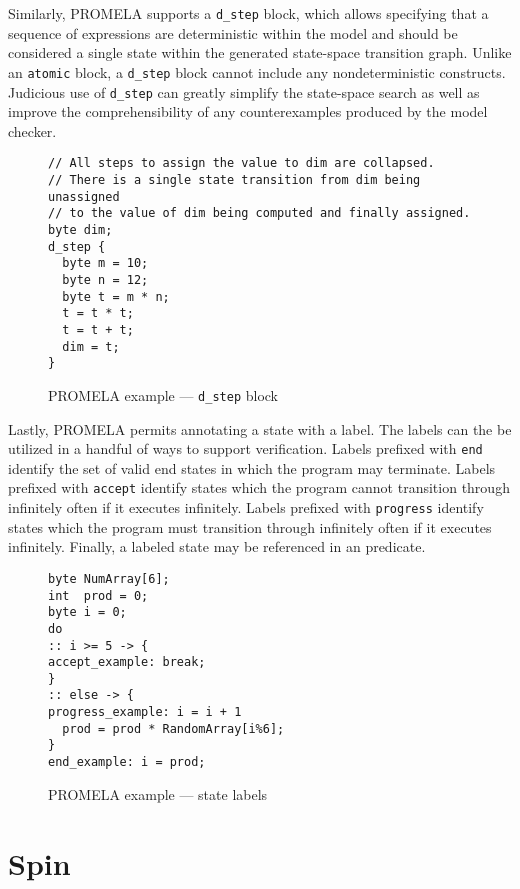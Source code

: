 Similarly, PROMELA supports a \texttt{d\_step} block, which allows specifying that a sequence of expressions are deterministic within the model and should be considered a single state within the generated state-space transition graph.
Unlike an \texttt{atomic} block, a \texttt{d\_step} block cannot include any nondeterministic constructs.
Judicious use of \texttt{d\_step} can greatly simplify the state-space search as well as improve the comprehensibility of any counterexamples produced by the model checker.

\begin{figure}
\centering
\caption{PROMELA example --- \texttt{d\_step} block}
\begin{verbatim}
// All steps to assign the value to dim are collapsed.
// There is a single state transition from dim being unassigned
// to the value of dim being computed and finally assigned.
byte dim;
d_step {
  byte m = 10;
  byte n = 12;
  byte t = m * n; 
  t = t * t;
  t = t + t;
  dim = t;
}
\end{verbatim}
\end{figure}

Lastly, PROMELA permits annotating a state with a label.
The labels can the be utilized in a handful of ways to support verification.
Labels prefixed with \texttt{end} identify the set of valid end states in which the program may terminate.
Labels prefixed with \texttt{accept} identify states which the program cannot transition through infinitely often if it executes infinitely.
Labels prefixed with \texttt{progress} identify states which the program must transition through infinitely often if it executes infinitely.
Finally, a labeled state may be referenced in an  predicate.

\begin{figure}
\caption{PROMELA example --- state labels}
\begin{verbatim}
byte NumArray[6];
int  prod = 0;
byte i = 0;
do
:: i >= 5 -> { 
accept_example: break;
}
:: else -> {
progress_example: i = i + 1
  prod = prod * RandomArray[i%6];
}
end_example: i = prod;
\end{verbatim}
\end{figure}
  

\hypertarget{spin}{%
\section{Spin}\label{spin}}

